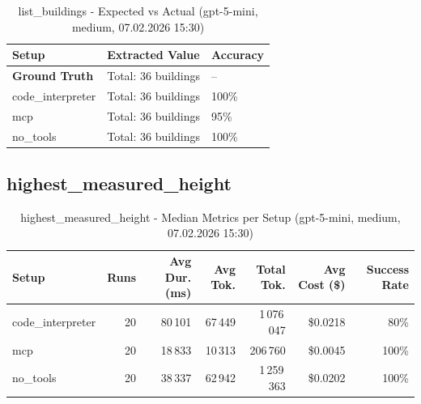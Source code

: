 \documentclass[a4paper,11pt]{article}
\begin{document}
\begin{table}[H]
\centering
\scriptsize
\caption{list\_buildings - Expected vs Actual (gpt-5-mini, medium, 07.02.2026 15:30)}
\begin{tabular}{l l l}
\toprule
Setup & Extracted Value & Accuracy \\
\midrule
\textbf{Ground Truth} & Total: 36 buildings & -- \\
\midrule
code\_interpreter & Total: 36 buildings & 100\% \\
mcp & Total: 36 buildings & 95\% \\
no\_tools & Total: 36 buildings & 100\% \\
\bottomrule
\end{tabular}
\end{table}

\clearpage

\subsection{highest\_measured\_height}

\begin{table}[H]
\centering
\scriptsize
\caption{highest\_measured\_height - Median Metrics per Setup (gpt-5-mini, medium, 07.02.2026 15:30)}
\label{tab:combined\_highest\_measured\_height\_metrics\_20260207}
\begin{tabular}{l r r r r r r}
\toprule
Setup & Runs & Avg Dur. (ms) & Avg Tok. & Total Tok. & Avg Cost (\$) & Success Rate \\
\midrule
code\_interpreter & 20 & 80\,101 & 67\,449 & 1\,076\,047 & \$0.0218 & 80\% \\
mcp & 20 & 18\,833 & 10\,313 & 206\,760 & \$0.0045 & 100\% \\
no\_tools & 20 & 38\,337 & 62\,942 & 1\,259\,363 & \$0.0202 & 100\% \\
\bottomrule
\end{tabular}
\end{table}
\end{document}
